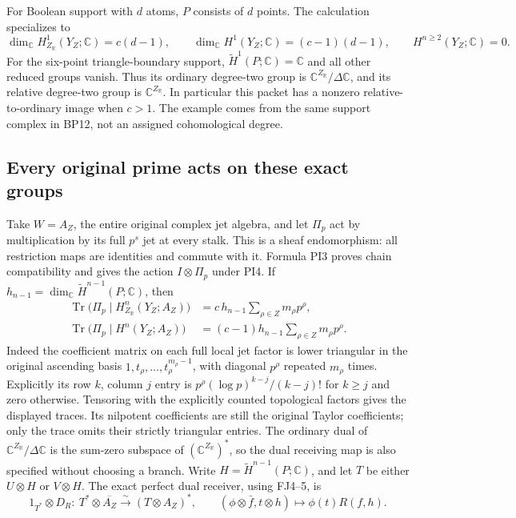 \documentclass[11pt,a4paper]{article}
\theoremstyle{definition}\newtheorem{definition}[theorem]{Definition}
\newcommand{\C}{\mathbb C}\newcommand{\R}{\mathbb R}
\begin{document}
For Boolean support with $d$ atoms, $P$ consists of $d$ points.
The calculation specializes to
\[
 \dim_\C H^1_{Z_\R}(Y_Z;\C)=c(d-1),\qquad
 \dim_\C H^1(Y_Z;\C)=(c-1)(d-1),
 \qquad H^{n\ge2}(Y_Z;\C)=0.
 \tag{PI5}\label{pi:boolean}
\]
For the six-point triangle-boundary support, $\widetilde H^1(P;\C)
=\C$ and all other reduced groups vanish. Thus its ordinary
degree-two group is $\C^{Z_\R}/\Delta\C$, and its relative
degree-two group is $\C^{Z_\R}$. In particular this packet
has a nonzero relative-to-ordinary image when $c>1$. The example
comes from the same support complex in BP12, not an assigned
cohomological degree.

\subsection{Every original prime acts on these exact groups}
Take $W=A_Z$, the entire original complex jet algebra, and let
$\Pi_p$ act by multiplication by its full $p^s$ jet at every
stalk. This is a sheaf endomorphism: all restriction maps are
identities and commute with it. Formula PI3 proves chain
compatibility and gives the action $I\otimes\Pi_p$ under PI4.
If $h_{n-1}=\dim_\C\widetilde H^{n-1}(P;\C)$, then
\[
 \begin{aligned}
 \operatorname{Tr}\bigl(\Pi_p\mid H^n_{Z_\R}(Y_Z;A_Z)\bigr)
 &=c\,h_{n-1}\sum_{\rho\in Z}m_\rho p^\rho,\\
 \operatorname{Tr}\bigl(\Pi_p\mid H^n(Y_Z;A_Z)\bigr)
 &=(c-1)h_{n-1}\sum_{\rho\in Z}m_\rho p^\rho.
 \end{aligned}
 \tag{PI6}\label{pi:traces}
\]
Indeed the coefficient matrix on each full local jet factor is
lower triangular in the original ascending basis
$1,t_\rho,\ldots,t_\rho^{m_\rho-1}$, with diagonal $p^\rho$
repeated $m_\rho$ times. Explicitly its row $k$, column $j$ entry is
$p^\rho(\log p)^{k-j}/(k-j)!$ for $k\ge j$ and zero otherwise.
Tensoring with the explicitly counted topological factors gives
the displayed traces. Its nilpotent coefficients are still the
original Taylor coefficients; only the trace omits their strictly
triangular entries. The ordinary dual of
$\C^{Z_\R}/\Delta\C$ is the sum-zero subspace of
$(\C^{Z_\R})^*$, so the dual receiving map is also specified
without choosing a branch. Write $H=\widetilde H^{n-1}(P;\C)$,
and let $T$ be either $U\otimes H$ or $V\otimes H$. The exact
perfect dual receiver, using FJ4--5, is
\[
 1_{T^*}\otimes D_R:\ T^*\otimes\overline{A_Z}
     \xrightarrow{\sim}(T\otimes A_Z)^*,\qquad
 (\phi\otimes\bar f,t\otimes h)\longmapsto\phi(t)R(f,h).
 \tag{PI8}\label{pi:dual-receiver}
\]
\end{document}
